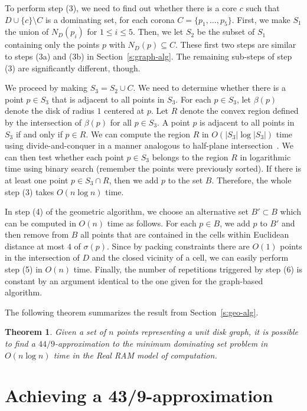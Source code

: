 \documentclass[preprint,12pt]{elsarticle}
\newtheorem{thm}{Theorem}
\begin{document}
To perform step (3), we need to find out whether there is a core $c$ such that $D \cup \{c\} \setminus C$ is a dominating set, for each corona $C = \{p_1,\ldots,p_5\}$. First, we make $S_1$ the union of $N_D(p_i)$ for $1 \leq i \leq 5$. Then, we let $S_2$ be the subset of $S_1$ containing only the points $p$ with $N_D(p) \subseteq C$. These first two steps are similar to steps (3a) and (3b) in Section~\ref{s:graph-alg}. The remaining sub-steps of step (3) are significantly different, though.

We proceed by making $S_3 = S_2 \cup C$. We need to determine whether there is a point $p \in S_3$ that is adjacent to all points in $S_3$. For each $p \in S_3$, let $\beta(p)$ denote the disk of radius $1$ centered at $p$. Let $R$ denote the convex region defined by the intersection of $\beta(p)$ for all $p \in S_3$. A point $p$ is adjacent to all points in $S_3$ if and only if $p \in R$. We can compute the region $R$ in $O(|S_3| \log |S_3|)$ time using divide-and-conquer in a manner analogous to half-plane intersection~\cite{cg}. We can then test whether each point $p \in S_3$ belongs to the region $R$ in logarithmic time using binary search (remember the points were previously sorted). If there is at least one point $p \in S_3 \cap R$, then we add $p$ to the set $B$. Therefore, the whole step (3) takes $O(n \log n)$ time.

In step (4) of the geometric algorithm, we choose an alternative set $B' \subset B$ which can be computed in $O(n)$ time as follows. For each $p \in B$, we add $p$ to $B'$ and then remove from $B$ all points that are contained in the cells within Euclidean distance at most $4$ of $\sigma(p)$. Since by packing constraints there are $O(1)$ points in the intersection of $D$ and the closed vicinity of a cell, we can easily perform step (5) in $O(n)$ time. Finally, the number of repetitions triggered by step (6) is constant by an argument identical to the one given for the graph-based algorithm.

The following theorem summarizes the result from Section~\ref{s:geo-alg}.

\begin{thm} \label{thm:geo-alg}
Given a set of $n$ points representing a unit disk graph, it is possible to find a $44/9$-approximation to the minimum dominating set problem in $O(n \log n)$ time in the Real RAM model of computation.
\end{thm}

\section{Achieving a 43/9-approximation} \label{s:partial}
\end{document}
